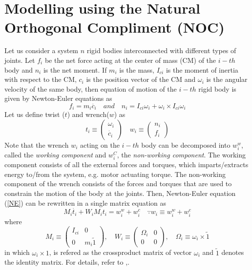 \section{Modelling using the Natural Orthogonal Compliment (NOC)}
Let us consider a system $n$ rigid bodies interconnected with different types of joints. 
Let $f_i$ be the net force acting at the center of mass (CM) of the $i-th$  body and $n_i$ is the net moment.
 If $m_i$ is the mass, $I_{ci}$ is the  moment of inertia with respect to the CM, $c_i$ is the position vector of the CM and $\omega_i$ is the angular velocity of the same body, then equation of motion of the $i-th$ rigid body is given by Newton-Euler equations as 
\begin{equation}
\label{NE}
f_i=m_i\ddot{c_i} \quad and \quad n_i=I_{ci} \omega_i+\omega_i \times I_{ci} \omega_i
\end{equation}
Let us  define twist ($t$) and wrench($w$) as 
\begin{equation*}
t_i \equiv \begin{pmatrix}
\omega_i\\ \dot{c_i}
\end{pmatrix} \quad
w_i \equiv \begin{pmatrix}
n_i\\f_i
\end{pmatrix}
\end{equation*}
Note that the wrench $w_i$ acting on the $i-th$ body can be decomposed into $w^w_i$, called the \textit{working component} and  $w^C_i$, the \textit{non-working component}.
 The working component consists of all the external  forces and torques, which imparts/extracts energy to/from the system, e.g. motor actuating torque.
  The non-working component of the wrench consists of the forces and torques that are used to constrain the motion of the body at the joints.
Then, Newton-Euler equation (\ref{NE}) can be rewritten  in a single matrix equation as 
\begin{equation}
\label{2}
M_i\dot{t_i}+W_iM_it_i=w^w_i+w^c_i \quad \because w_i \equiv w^w_i+w^c_i
\end{equation}
where
\begin{equation}
\label{3}
M_i \equiv \begin{pmatrix}
I_{ci} & 0\\0 & m_i\tilde{1}
\end{pmatrix} ,
\quad W_i\equiv \begin{pmatrix}
\Omega_i &0\\0&0
\end{pmatrix},
\quad
\Omega_i\equiv \omega_i\times \tilde{1}
\end{equation}
in which  $\omega_i\times 1$, is refered as the crossproduct matrix of vector $\omega_i$ and $\tilde{1}$ denotes the identity matrix.
For details, refer to \cite{angeles2013fundamentals},\cite{saha2010robotics}.



